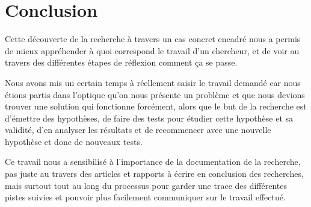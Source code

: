 \chapter*{Conclusion}
\label{chap:conclusion}

Cette découverte de la recherche à travers un cas concret encadré nous a permis de mieux appréhender à quoi correspond le travail d'un chercheur, et de voir au travers des différentes étapes de réflexion comment ça se passe.

Nous avons mis un certain temps à réellement saisir le travail demandé car nous étions partis dans l'optique qu'on nous présente un problème et que nous devions trouver une solution qui fonctionne forcément, alors que le but de la recherche est d'émettre des hypothèses, de faire des tests pour étudier cette hypothèse et sa validité, d'en analyser les résultats et de recommencer avec une nouvelle hypothèse et donc de nouveaux tests.

Ce travail nous a sensibilisé à l'importance de la documentation de la recherche, pas juste au travers des articles et rapports à écrire en conclusion des recherches, mais surtout tout au long du processus pour garder une trace des différentes pistes suivies et pouvoir plus facilement communiquer sur le travail effectué.

